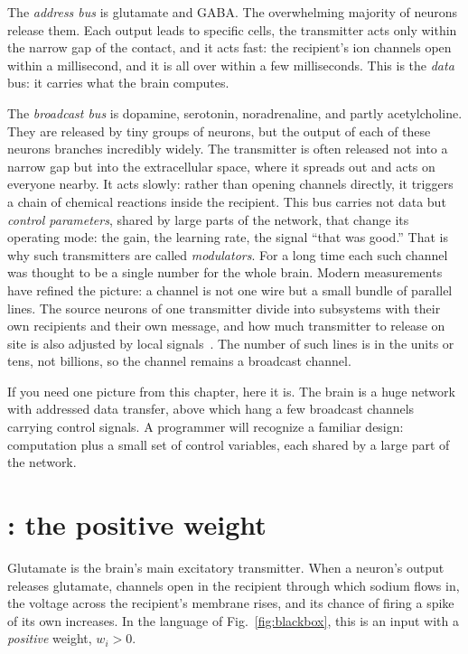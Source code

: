 The \emph{address bus} is glutamate and GABA. The overwhelming majority of neurons release them. Each output leads to specific cells, the transmitter acts only within the narrow gap of the contact, and it acts fast: the recipient's ion channels open within a millisecond, and it is all over within a few milliseconds. This is the \emph{data} bus: it carries what the brain computes.

The \emph{broadcast bus} is dopamine, serotonin, noradrenaline, and partly acetylcholine. They are released by tiny groups of neurons, but the output of each of these neurons branches incredibly widely. The transmitter is often released not into a narrow gap but into the extracellular space, where it spreads out and acts on everyone nearby. It acts slowly: rather than opening channels directly, it triggers a chain of chemical reactions inside the recipient. This bus carries not data but \emph{control parameters}, shared by large parts of the network, that change its operating mode: the gain, the learning rate, the signal ``that was good.'' That is why such transmitters are called \emph{modulators}. For a long time each such channel was thought to be a single number for the whole brain. Modern measurements have refined the picture: a channel is not one wire but a small bundle of parallel lines. The source neurons of one transmitter divide into subsystems with their own recipients and their own message, and how much transmitter to release on site is also adjusted by local signals~\cite{Ren2018,Poe2020}. The number of such lines is in the units or tens, not billions, so the channel remains a broadcast channel.

If you need one picture from this chapter, here it is. The brain is a huge network with addressed data transfer, above which hang a few broadcast channels carrying control signals. A programmer will recognize a familiar design: computation plus a small set of control variables, each shared by a large part of the network.

\section{: the positive weight}

Glutamate is the brain's main excitatory transmitter. When a neuron's output releases glutamate, channels open in the recipient through which sodium flows in, the voltage across the recipient's membrane rises, and its chance of firing a spike of its own increases. In the language of Fig.~\ref{fig:blackbox}, this is an input with a \emph{positive} weight, $w_i>0$.

